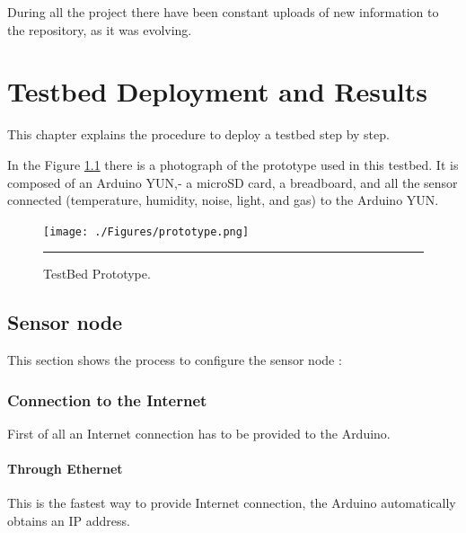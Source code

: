 \documentclass[12pt, a4paper,twoside]{tesi_upf}
\begin{document}
		During all the project there have been constant uploads of new information to the repository, as it was evolving.


\chapter{Testbed Deployment and Results}
\label{Chapter5}

  This chapter explains the procedure to deploy a testbed step by step.
  
  In the Figure \ref{fig:TestBed_Prototype} there is a photograph of the prototype used in this testbed. It is composed of an Arduino YUN,- a microSD card, a breadboard, and all the sensor connected (temperature, humidity, noise, light, and gas) to the Arduino YUN.
  
  \begin{figure}[htbp]
      \centering
          \texttt{[image: ./Figures/prototype.png]}
          \rule{35em}{0.5pt}
      \caption[TestBed Prototype]{TestBed Prototype.}
      \label{fig:TestBed_Prototype}
  \end{figure} 
  
  \section{Sensor node}
  
  	This section shows the process to configure the sensor node \cite{guideArduinoYun}:
  
  \subsection{Connection to the Internet}
    First of all an Internet connection has to be provided to the Arduino.
    \subsubsection{Through Ethernet}
      This is the fastest way to provide Internet connection, the Arduino automatically obtains an IP address.
      
\end{document}
